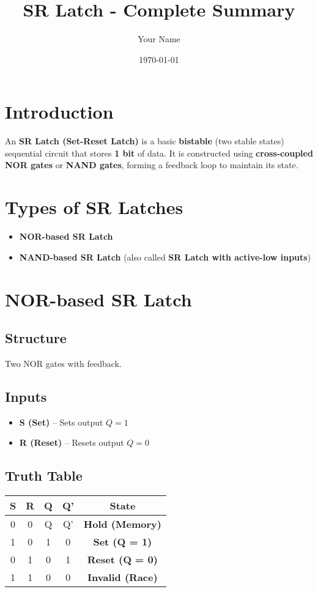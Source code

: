 \documentclass{article}
\title{SR Latch - Complete Summary}
\author{Your Name}
\date{\today}
\begin{document}
\maketitle

\section{Introduction}
An \textbf{SR Latch (Set-Reset Latch)} is a basic \textbf{bistable} (two stable states) sequential circuit that stores \textbf{1 bit} of data. It is constructed using \textbf{cross-coupled NOR gates} or \textbf{NAND gates}, forming a feedback loop to maintain its state.

\section{Types of SR Latches}
\begin{itemize}
    \item \textbf{NOR-based SR Latch}
    \item \textbf{NAND-based SR Latch} (also called \textbf{SR Latch with active-low inputs})
\end{itemize}

\section{NOR-based SR Latch}
\subsection{Structure}
Two NOR gates with feedback.

\subsection{Inputs}
\begin{itemize}
    \item \textbf{S (Set)} – Sets output \( Q = 1 \)
    \item \textbf{R (Reset)} – Resets output \( Q = 0 \)
\end{itemize}

\subsection{Truth Table}
\begin{center}
\begin{tabular}{ccccc}
\toprule
\textbf{S} & \textbf{R} & \textbf{Q} & \textbf{Q'} & \textbf{State} \\
\midrule
0 & 0 & Q & Q' & \textbf{Hold (Memory)} \\
1 & 0 & 1 & 0 & \textbf{Set (Q = 1)} \\
0 & 1 & 0 & 1 & \textbf{Reset (Q = 0)} \\
1 & 1 & 0 & 0 & \textbf{Invalid (Race)} \\
\bottomrule
\end{tabular}
\end{center}
\end{document}
